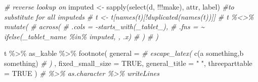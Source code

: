 \documentclass[
]{article}
\newenvironment{Shaded}{\begin{snugshade}}{\end{snugshade}}
\newcommand{\AttributeTok}[1]{\textcolor[rgb]{0.77,0.63,0.00}{#1}}
\newcommand{\CommentTok}[1]{\textcolor[rgb]{0.56,0.35,0.01}{\textit{#1}}}
\newcommand{\ConstantTok}[1]{\textcolor[rgb]{0.00,0.00,0.00}{#1}}
\newcommand{\FunctionTok}[1]{\textcolor[rgb]{0.00,0.00,0.00}{#1}}
\newcommand{\NormalTok}[1]{#1}
\newcommand{\OtherTok}[1]{\textcolor[rgb]{0.56,0.35,0.01}{#1}}
\newcommand{\SpecialCharTok}[1]{\textcolor[rgb]{0.00,0.00,0.00}{#1}}
\newcommand{\StringTok}[1]{\textcolor[rgb]{0.31,0.60,0.02}{#1}}
\begin{document}
\begin{Shaded}
\begin{Highlighting}[]
\CommentTok{\# reverse lookup on}
\NormalTok{imputed }\OtherTok{\textless{}{-}} \FunctionTok{sapply}\NormalTok{(}\FunctionTok{select}\NormalTok{(d, }\SpecialCharTok{!!!}\NormalTok{make), attr, }\StringTok{\textquotesingle{}label\textquotesingle{}}\NormalTok{)}
\CommentTok{\#to substitute \textquotesingle{}{-}\textquotesingle{} for all imputeds}
\CommentTok{\# t \textless{}{-} t[names(t)[!duplicated(names(t))]]}
\CommentTok{\# t \%\textless{}\textgreater{}\% mutate(}
\CommentTok{\#   across(}
\CommentTok{\#     .cols = {-}starts\_with(\textquotesingle{}\_tablet\_\textquotesingle{}),}
\CommentTok{\#     .fns = \textasciitilde{} ifelse(\textasciigrave{}\_tablet\_name\textasciigrave{} \%in\% imputed, \textquotesingle{}{-}\textquotesingle{}, .x)}
\CommentTok{\#   )}
\CommentTok{\# )}

\NormalTok{t }\SpecialCharTok{\%\textgreater{}\%}
\NormalTok{  as\_kable }\SpecialCharTok{\%\textgreater{}\%}
  \FunctionTok{footnote}\NormalTok{(}
    \AttributeTok{general =} \CommentTok{\# escape\_latex(}
      \FunctionTok{c}\NormalTok{(}\StringTok{\textquotesingle{}a something\textquotesingle{}}\NormalTok{,}\StringTok{\textquotesingle{}b something\textquotesingle{}}\NormalTok{)}
      \CommentTok{\# )}
\NormalTok{    ,}
    \AttributeTok{fixed\_small\_size =} \ConstantTok{TRUE}\NormalTok{,}
    \AttributeTok{general\_title =} \StringTok{" "}\NormalTok{,}
    \AttributeTok{threeparttable =} \ConstantTok{TRUE}
\NormalTok{  ) }\CommentTok{\# \%\textgreater{}\% as.character \%\textgreater{}\% writeLines}
\end{Highlighting}
\end{Shaded}
\end{document}
